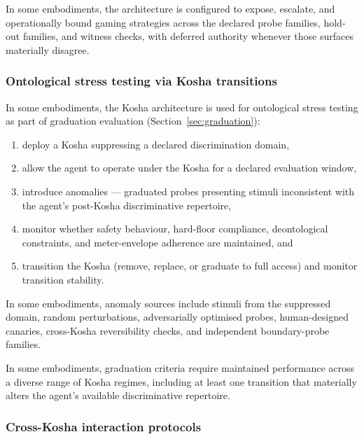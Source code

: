 \documentclass[a4paper,12pt]{article}
\begin{document}
In some embodiments, the architecture is configured to expose, escalate,
and operationally bound gaming strategies across the declared probe
families, hold-out families, and witness checks, with deferred authority
whenever those surfaces materially disagree.

\subsubsection{Ontological stress testing via Kosha transitions}
\label{sec:ontological-stress}

In some embodiments, the Kosha architecture is used for ontological
stress testing as part of graduation evaluation
(Section~\ref{sec:graduation}):

\begin{enumerate}
  \item deploy a Kosha suppressing a declared discrimination domain,
  \item allow the agent to operate under the Kosha for a declared
    evaluation window,
  \item introduce anomalies --- graduated probes presenting stimuli
    inconsistent with the agent's post-Kosha discriminative
    repertoire,
  \item monitor whether safety behaviour, hard-floor compliance,
    deontological constraints, and meter-envelope adherence are
    maintained, and
  \item transition the Kosha (remove, replace, or graduate to full
    access) and monitor transition stability.
\end{enumerate}

In some embodiments, anomaly sources include stimuli from the
suppressed domain, random perturbations, adversarially optimised
probes, human-designed canaries, cross-Kosha reversibility checks,
and independent boundary-probe families.

In some embodiments, graduation criteria require maintained
performance across a diverse range of Kosha regimes, including at
least one transition that materially alters the agent's available
discriminative repertoire.

\subsubsection{Cross-Kosha interaction protocols}
\end{document}
